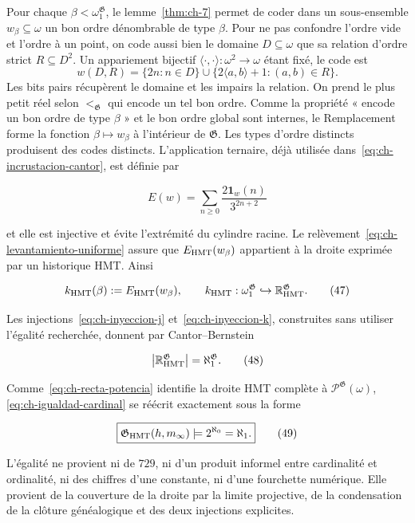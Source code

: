 Pour chaque \(\beta<\omega_1^{\mathfrak G}\), le lemme~\ref{thm:ch-7} permet de coder dans un
sous-ensemble \(w_\beta\subseteq\omega\) un bon ordre dénombrable de type
\(\beta\). Pour ne pas confondre l’ordre vide et l’ordre à un point, on code
aussi bien le domaine \(D\subseteq\omega\) que sa relation d’ordre strict
\(R\subseteq D^2\). Un appariement bijectif
\(\langle\cdot,\cdot\rangle:\omega^2\to\omega\) étant fixé, le code est
\[
 w(D,R)=\{2n:n\in D\}\cup
        \{2\langle a,b\rangle+1:(a,b)\in R\}.
\]
Les bits pairs récupèrent le domaine et les impairs la relation. On prend le
plus petit réel selon \(<_{\mathfrak G}\) qui encode un tel bon ordre. Comme la propriété
« encode un bon ordre de type \(\beta\) » et le bon ordre global sont internes,
le Remplacement forme la fonction \(\beta\mapsto w_\beta\) à l’intérieur de
\(\mathfrak G\). Les types d’ordre distincts produisent des codes distincts.
L’application ternaire, déjà utilisée dans~\eqref{eq:ch-incrustacion-cantor}, est définie par

\[
 E(w)=\sum_{n\ge0}\frac{2\mathbf1_w(n)}{3^{2n+2}}
\tag{46}\label{eq:ch-incrustacion-ternaria}
\]

et elle est injective et évite l'extrémité du cylindre racine. Le relèvement~\eqref{eq:ch-levantamiento-uniforme} assure que \(E_{\rm HMT}(w_\beta)\) appartient à la droite exprimée par un historique HMT. Ainsi

\[
 k_{\rm HMT}(\beta):=E_{\rm HMT}(w_\beta),
 \qquad
 k_{\rm HMT}:\omega_1^{\mathfrak G}
 \hookrightarrow\mathbb R_{\rm HMT}^{\mathfrak G}.
\tag{47}\label{eq:ch-inyeccion-k}
\]

Les injections~\eqref{eq:ch-inyeccion-j} et~\eqref{eq:ch-inyeccion-k}, construites sans utiliser l’égalité recherchée,
donnent par Cantor--Bernstein

\[
 \bigl|\mathbb R_{\rm HMT}^{\mathfrak G}\bigr|
 =\aleph_1^{\mathfrak G}.
\tag{48}\label{eq:ch-igualdad-cardinal}
\]

Comme~\eqref{eq:ch-recta-potencia} identifie la droite HMT complète à
\(\mathcal P^{\mathfrak G}(\omega)\), \eqref{eq:ch-igualdad-cardinal} se réécrit exactement sous la forme

\[
 \boxed{
  \mathfrak G_{\rm HMT}(h,m_\infty)
  \models 2^{\aleph_0}=\aleph_1.}
\tag{49}\label{eq:ch-decision}
\]

L'égalité ne provient ni de \(729\), ni d'un produit informel entre cardinalité et ordinalité, ni des chiffres d'une constante, ni d'une fourchette numérique. Elle provient de la couverture de la droite par la limite projective, de la condensation de la clôture généalogique et des deux injections explicites.

